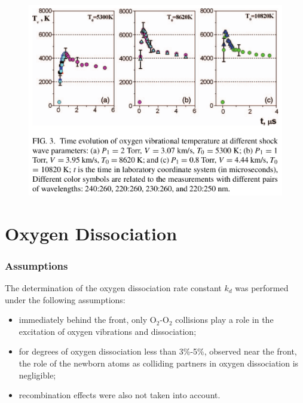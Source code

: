 \documentclass[10pt]{beamer}
\begin{document}
\begin{frame}
\begin{figure}[ht]
	\centering
	\includegraphics[width=\textwidth]{figures/vibroTemp.png}
\end{figure}
\end{frame}


\section{Oxygen Dissociation}

\begin{frame}
\frametitle{Assumptions}
The determination of the oxygen dissociation rate constant $k_d$ was performed under the following assumptions:
\begin{itemize}
	\item immediately behind the front, only O$_2$-O$_2$ collisions play a role
	in the excitation of oxygen vibrations and dissociation;
	\item for degrees of oxygen dissociation less than 3\%-5\%, observed near
	the front, the role of the newborn atoms as colliding partners in oxygen
	dissociation is negligible;
	\item recombination effects were also not taken into account.
\end{itemize}
\end{frame}
\end{document}
